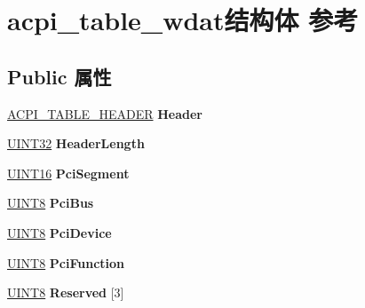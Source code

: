 \hypertarget{structacpi__table__wdat}{}\section{acpi\+\_\+table\+\_\+wdat结构体 参考}
\label{structacpi__table__wdat}
\subsection*{Public 属性}
\begin{DoxyCompactItemize}
\item 
\mbox{\label{structacpi__table__wdat_a22dc5878dd14a8d6944e1f31f2f4e8cb}} 
\hyperlink{structacpi__table__header}{A\+C\+P\+I\+\_\+\+T\+A\+B\+L\+E\+\_\+\+H\+E\+A\+D\+ER} {\bfseries Header}
\item 
\mbox{\label{structacpi__table__wdat_aa6f100c284493cc965d948400293e48f}} 
\hyperlink{_processor_bind_8h_ae1e6edbbc26d6fbc71a90190d0266018}{U\+I\+N\+T32} {\bfseries Header\+Length}
\item 
\mbox{\label{structacpi__table__wdat_a6f7053cf036bc802aa4bfbbe954b66bd}} 
\hyperlink{_processor_bind_8h_a09f1a1fb2293e33483cc8d44aefb1eb1}{U\+I\+N\+T16} {\bfseries Pci\+Segment}
\item 
\mbox{\label{structacpi__table__wdat_a4ae69d3df435cb526cf55509f1b49e57}} 
\hyperlink{_processor_bind_8h_ab27e9918b538ce9d8ca692479b375b6a}{U\+I\+N\+T8} {\bfseries Pci\+Bus}
\item 
\mbox{\label{structacpi__table__wdat_aca0428de9f85a40e4a712b340bb968fe}} 
\hyperlink{_processor_bind_8h_ab27e9918b538ce9d8ca692479b375b6a}{U\+I\+N\+T8} {\bfseries Pci\+Device}
\item 
\mbox{\label{structacpi__table__wdat_ac3770d65df85bfdc7597a8c9401f5793}} 
\hyperlink{_processor_bind_8h_ab27e9918b538ce9d8ca692479b375b6a}{U\+I\+N\+T8} {\bfseries Pci\+Function}
\item 
\mbox{\label{structacpi__table__wdat_a956e1ceba5cae3b5f8975c76b30697dc}} 
\hyperlink{_processor_bind_8h_ab27e9918b538ce9d8ca692479b375b6a}{U\+I\+N\+T8} {\bfseries Reserved} \mbox{[}3\mbox{]}

\end{DoxyCompactItemize}
